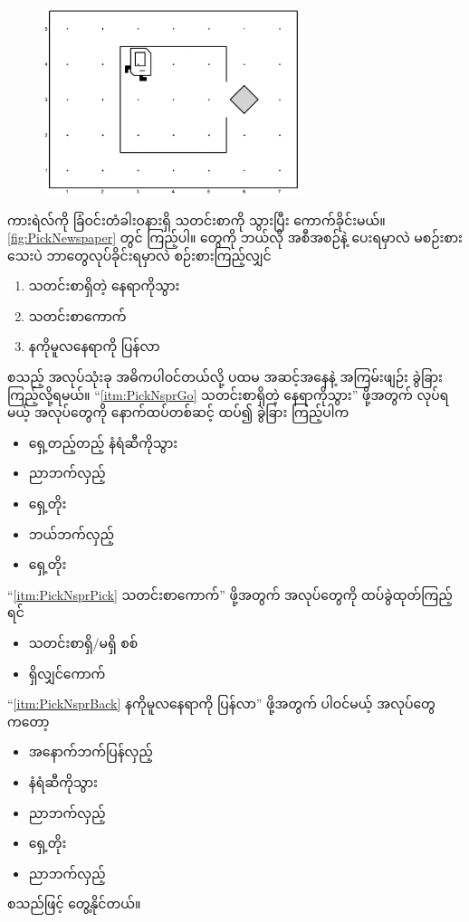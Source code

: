 \begin{sloppypar}
\section{}
\begin{figure}[!htb]
  \caption{}\label{fig:PickNewspaper}
  \includegraphics[width=3in, left]{ch03/PickNewspaper/init.jpg}
\end{figure}
ကားရဲလ်ကို ခြံဝင်းတံခါးဝနားရှိ သတင်းစာကို သွားပြီး ကောက်ခိုင်းမယ်။ \Fig \vref{fig:PickNewspaper} တွင် ကြည့်ပါ။ \mmcommand တွေကို ဘယ်လို အစီအစဉ်နဲ့ ပေးရမှာလဲ မစဉ်းစားသေးပဲ ဘာတွေလုပ်ခိုင်းရမှာလဲ စဉ်းစားကြည့်လျှင်
 \begin{enumerate}
   \item သတင်းစာရှိတဲ့ နေရာကိုသွား \label{itm:PickNsprGo}
   \item သတင်းစာကောက် \label{itm:PickNsprPick}
   \item နကိုမူလနေရာကို ပြန်လာ \label{itm:PickNsprBack}
 \end{enumerate}
 စသည့် အလုပ်သုံးခု အဓိကပါဝင်တယ်လို့ ပထမ အဆင့်အနေနဲ့ အကြမ်းဖျဉ်း ခွဲခြားကြည့်လို့ရမယ်။ “\ref*{itm:PickNsprGo} သတင်းစာရှိတဲ့ နေရာကိုသွား” ဖို့အတွက် လုပ်ရမယ့် အလုပ်တွေကို နောက်ထပ်တစ်ဆင့် ထပ်၍ ခွဲခြား ကြည့်ပါက
\begin{itemize}
  \item ရှေ့တည့်တည့် နံရံဆီကိုသွား
  \item ညာဘက်လှည့်
  \item ရှေ့တိုး 
  \item ဘယ်ဘက်လှည့်
  \item ‌ရှေ့တိုး 
\end{itemize}
“\ref*{itm:PickNsprPick} သတင်းစာကောက်” ဖို့အတွက် အလုပ်တွေကို ထပ်ခွဲထုတ်ကြည့်ရင်
\begin{itemize}
  \item သတင်းစာရှိ/မရှိ စစ်
  \item ရှိလျှင်ကောက် 
\end{itemize}
“\ref*{itm:PickNsprBack} နကိုမူလနေရာကို ပြန်လာ” ဖို့အတွက် ပါဝင်မယ့် အလုပ်တွေကတော့
 \begin{itemize}
  \item အနောက်ဘက်ပြန်လှည့်
  \item နံရံဆီကိုသွား 
  \item ညာဘက်လှည့်
  \item ရှေ့တိုး
  \item ညာဘက်လှည့်
\end{itemize}
စသည်ဖြင့် တွေ့နိုင်တယ်။


\end{sloppypar}
